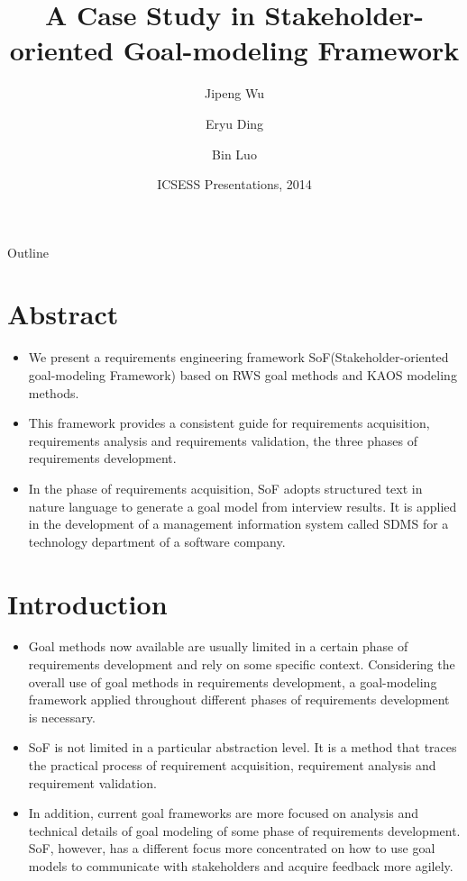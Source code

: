﻿\documentclass{beamer}
\title[A Case Study in SoF] {A Case Study in Stakeholder-oriented Goal-modeling Framework}
\subtitle{}
\author[Author]{Jipeng Wu \and Eryu Ding \and Bin Luo}
\institute[Universities of Somewhere and Elsewhere] {
                                 Software Institute\\
                                 Nanjing University
     }
\date[ICSESS 2014]
{ICSESS Presentations, 2014}
\begin{document}
\begin{frame}
  \titlepage
\end{frame}

\begin{frame}{Outline}
  \tableofcontents
\end{frame}

\section{Abstract}   
\begin{frame}{}          %
  \begin{itemize}
  \item We present a requirements engineering framework SoF(Stakeholder-oriented goal-modeling Framework) based on RWS goal methods and KAOS modeling methods.  \pause
  \item This framework provides a consistent guide for requirements acquisition, requirements analysis and requirements validation, the three phases of requirements development. \pause
  \item 
    In the phase of requirements acquisition, SoF adopts structured text in nature language to generate a goal model from interview results. It is applied in the development of a management information system called SDMS for a technology department of a software company. \pause
  \end{itemize}
\end{frame}  

\section{Introduction}  
\begin{frame}              %
  \small{
  \begin{itemize}
  \item
    Goal methods now available are usually limited in a certain phase of requirements development and rely on some specific context.  Considering the overall use of goal methods in requirements development, a goal-modeling framework applied throughout different phases of requirements development is necessary.\pause
  \item
    SoF is not limited in a particular abstraction level. It is a method that traces the practical process of requirement acquisition, requirement analysis and requirement validation.\pause
  \item 
    In addition, current goal frameworks are more focused on analysis and technical details of goal modeling of some phase of requirements development. SoF, however, has a different focus more concentrated on how to use goal models to communicate with stakeholders and acquire feedback more agilely. \pause
  \end{itemize}
  }
\end{frame}
\end{document}
